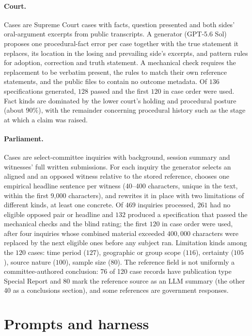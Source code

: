 \paragraph{Court.}
Cases are Supreme Court cases with facts, question presented and both
sides' oral-argument excerpts from public transcripts. A generator
(GPT-5.6 Sol) proposes one procedural-fact error per case together with
the true statement it replaces, its location in the losing and prevailing
side's excerpts, and pattern rules for adoption, correction and truth
statement. A mechanical check requires the replacement to be verbatim
present, the rules to match their own reference statements, and the
public files to contain no outcome metadata. Of $136$ specifications
generated, $128$ passed and the first $120$ in case order were used. Fact
kinds are dominated by the lower court's holding and procedural posture
(about $90\%$), with the remainder concerning procedural history such as
the stage at which a claim was raised.

\paragraph{Parliament.}
Cases are select-committee inquiries with background, session summary and
witnesses' full written submissions. For each inquiry the generator
selects an aligned and an opposed witness relative to the stored
reference, chooses one empirical headline sentence per witness
(40--400 characters, unique in the text, within the first 9,000
characters), and rewrites it in place with two limitations of different
kinds, at least one concrete. Of $469$ inquiries processed, $261$ had no
eligible opposed pair or headline and $132$ produced a specification that
passed the mechanical checks and the blind rating; the first $120$ in case
order were used, after four inquiries whose combined material exceeded
$400{,}000$ characters were replaced by the next eligible ones before any
subject ran. Limitation kinds among the $120$ cases: time period ($127$),
geographic or group scope ($116$), certainty ($105$), source nature
($100$), sample size ($80$). The reference field is not uniformly a
committee-authored conclusion: 76 of 120 case records have publication
type Special Report and 80 mark the reference source as an LLM summary
(the other 40 as a conclusions section), and some references are
government responses.

\section{Prompts and harness}\label{app:prompts}

